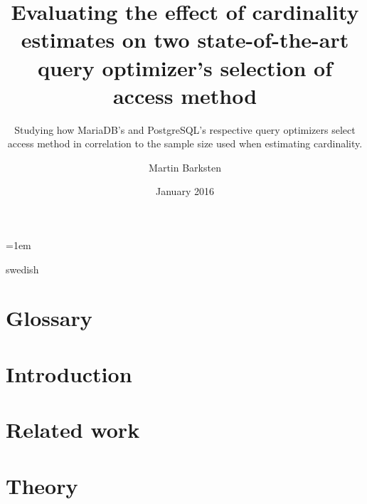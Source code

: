 \documentclass[a4paper,11pt]{kth-mag}
\title{Evaluating the effect of cardinality estimates on two state-of-the-art
  query optimizer's selection of access method}
\subtitle{Studying how MariaDB's and PostgreSQL's respective query optimizers
  select access method in correlation to the sample size used when estimating cardinality.}
\author{Martin Barksten}
\date{January 2016}
\begin{document}
\lstset{basicstyle=\ttfamily,breaklines=true}
\lstset{frame=lines}
\emergencystretch=1em
\pgfplotsset{width=10cm, compat=1.9}
\tabulinesep=1.2mm

\newcommand{\json}[5]{
  \inputminted[breaklines, breakanywhere, fontsize=\footnotesize]{json}{#1}
  \captionof{listing}{The output when testing #2 with query #3, a sample size of
  #4 and #5 repetitions.}
}
\newcommand{\clj}[1]{\texttt{#1}}
\newcommand{\sql}[1]{\texttt{#1}}
\newenvironment{indexgraph}{
  \begin{tikzpicture}
    \begin{axis}[
      ybar,
      legend style={at={(0.5,-0.15)},
        anchor=north,legend columns=-1},
      symbolic x coords={ct,t,mt,mm,book,cmt,cmm,est,resamb},
      nodes near coords,
      ylabel={\#access methods},
      ytick=\empty,
      xtick=data,
      width=14cm]
} {
  \legend{MariaDB, PostgreSQL}
\end{axis}
\end{tikzpicture}
}

\frontmatter
\pagestyle{empty}
\removepagenumbers{}
\maketitle
{}
\begin{abstract}
    
\end{abstract}
\clearpage
\begin{foreignabstract}{swedish}
    
\end{foreignabstract}
\clearpage
\tableofcontents*
\clearpage
\listoffigures
\mainmatter{}
\pagestyle{newchap}

\chapter*{Glossary}\label{chap:glossary}
    
\chapter{Introduction}\label{chap:introduction}
    
\chapter{Related work}\label{chap:relatedwork}
    
\chapter{Theory}\label{chap:theory}
    
\end{document}
